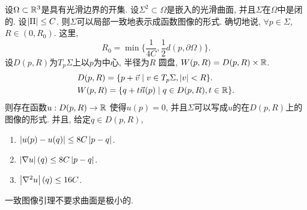 \begin{lemma}[一致图像引理] \label{uniform_graph}
    设$\Omega \subset \mathbb{R}^3$是具有光滑边界的开集. 设$\Sigma^2 \subset \Omega$是嵌入的光滑曲面, 并且$\Sigma$在$\Omega$中是闭的. 设$\left | {\Pi} \right | \le C$. 则$\Sigma$可以局部一致地表示成函数图像的形式. 确切地说, $\forall p \in \Sigma$, $R\in (0,R_0)$. 这里, 
    \begin{equation}
        R_0=\min\{\frac{1}{4C}, \frac{1}{2}d(p,\partial \Omega)\}.
    \end{equation}
    设$D(p,R)$为$T_p\Sigma$上以$p$为中心, 半径为$R$ 圆盘, $W(p,R)=D(p,R)\times \mathbb{R}$. 
    \begin{align}
        &D(p,R)= \{p+\vec{v}\mid v \in T_p\Sigma, \left | v \right | < R\}.  \\
        &W(p,R)= \{q+t\vec{n}(p)\mid q \in D(p,R), t \in \mathbb{R}\}.
    \end{align}
    则存在函数$u: D(p,R)\to \mathbb{R}$ 使得$u(p)=0$, 并且$\Sigma$可以写成$u$的在$D(p,R)$上的图像的形式. 并且, 给定$q \in D(p,R)$,
    \begin{enumerate}
        \item $\left | u(p)-u(q) \right | \le 8C\left | p-q \right |$.
        \item $\left | \nabla u \right |(q) \le 8C\left | p-q \right |$.
        \item $\left | \nabla^2 u \right |(q) \le 16C$.
    \end{enumerate}
\end{lemma}
\begin{remark}
    一致图像引理不要求曲面是极小的.
\end{remark}
